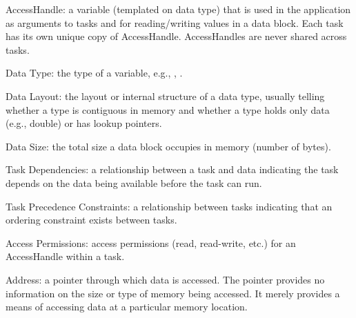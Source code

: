 \begin{compactitem}
\item AccessHandle: a variable (templated on data type) that is used in the application as arguments to 
  \glspl{task} and for reading/writing values in a data block.
  Each \gls{task} has its own unique copy of AccessHandle. AccessHandles are
  never shared across \glspl{task}.
\item Data Type: the type of a variable, e.g., , .
\item Data Layout: the layout or internal structure of a data type, usually telling whether a type is contiguous in memory and whether a type holds only data (e.g., double) or has lookup pointers.
\item Data Size: the total size a data block occupies in memory (number of bytes).
\item Task Dependencies: a relationship between a \gls{task} and data
  indicating the \gls{task} depends on the data being available before the
  \gls{task} can run.
\item Task Precedence Constraints: a relationship between \glspl{task} indicating
  that an ordering constraint exists between \glspl{task}.
\item Access Permissions: access permissions (read, read-write, etc.) for an
  AccessHandle within a \gls{task}.
\item Address: a pointer through which data is accessed.
The pointer provides no information on the size or type of memory being accessed.
It merely provides a means of accessing data at a particular memory location.
\end{compactitem}

